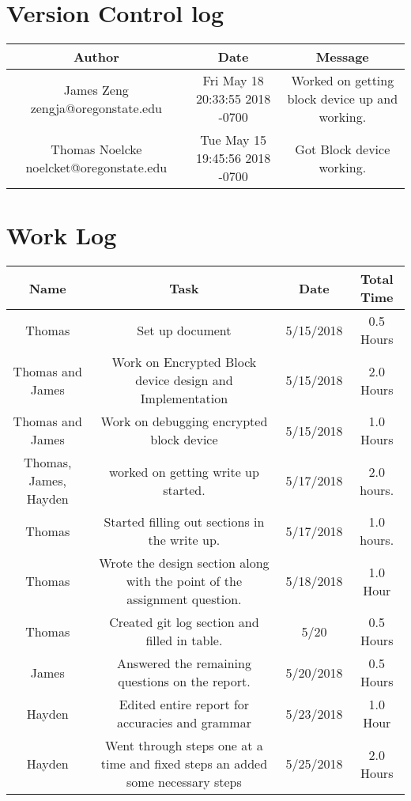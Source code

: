 \documentclass[draftclsnofoot, onecolumn, compsoc, 10pt]{IEEEtran}
\begin{document}
\newpage
\begin{landscape}

\section{Version Control log}
    \begin{center}
        \begin{tabular}{||c c c ||}
            \hline
            Author & Date & Message\\
            \hline \hline
            James Zeng zengja@oregonstate.edu  &
            Fri May 18 20:33:55 2018 -0700 &
            Worked on getting block device up and working.\\
            \hline
            Thomas Noelcke noelcket@oregonstate.edu & 
            Tue May 15 19:45:56 2018 -0700 &
            Got Block device working.\\
            \hline
        \end{tabular}
    \end{center}

\section{Work Log}
    	\begin{center}
			\begin{tabular}{||c c c c ||}
			\hline
			Name & Task & Date & Total Time\\[0.5ex]
			\hline \hline
			Thomas & Set up document  & 5/15/2018 & 0.5 Hours\\
			\hline
			Thomas and James  & Work on Encrypted Block device design and Implementation & 5/15/2018 & 2.0 Hours\\
			\hline
			Thomas and James & Work on debugging encrypted block device & 5/15/2018 & 1.0 Hours\\
			\hline
			Thomas, James, Hayden & worked on getting write up started. & 5/17/2018 & 2.0 hours.\\
			\hline
			Thomas & Started filling out sections in the write up. & 5/17/2018 & 1.0 hours.\\
			\hline
			Thomas & Wrote the design section along with the point of the assignment question. & 5/18/2018 & 1.0 Hour\\
			\hline
			Thomas & Created git log section and filled in table. & 5/20 & 0.5 Hours\\
			\hline
                        James & Answered the remaining questions on the report. & 5/20/2018 & 0.5 Hours\\
                        \hline
                        Hayden & Edited entire report for accuracies and grammar & 5/23/2018 & 1.0 Hour\\
                        \hline
                        Hayden & Went through steps one at a time and fixed steps an added some necessary steps & 5/25/2018 & 2.0 Hours\\
                        \hline
			\end{tabular}
		\end{center}
\end{landscape}
\newpage
\end{document}
